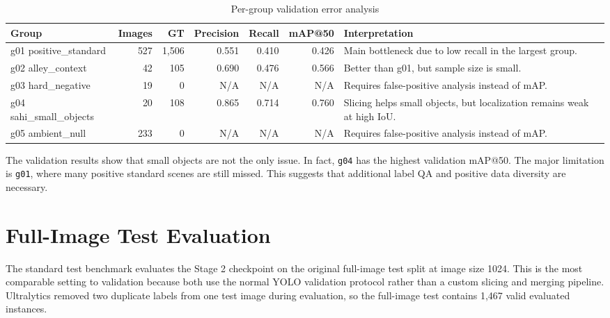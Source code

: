 \documentclass[12pt,a4paper]{report}
\newcommand{\code}[1]{\texttt{#1}}
\begin{document}
\begin{table}[H]
\centering
\small
\caption{Per-group validation error analysis}
\label{tab:group-valid}
\begin{tabularx}{\textwidth}{p{}rrrrrY}
\toprule
\textbf{Group} & \textbf{Images} & \textbf{GT} & \textbf{Precision} & \textbf{Recall} & \textbf{mAP@50} & \textbf{Interpretation} \\
\midrule
g01 positive\_standard & 527 & 1,506 & 0.551 & 0.410 & 0.426 & Main bottleneck due to low recall in the largest group. \\
g02 alley\_context & 42 & 105 & 0.690 & 0.476 & 0.566 & Better than g01, but sample size is small. \\
g03 hard\_negative & 19 & 0 & N/A & N/A & N/A & Requires false-positive analysis instead of mAP. \\
g04 sahi\_small\_objects & 20 & 108 & 0.865 & 0.714 & 0.760 & Slicing helps small objects, but localization remains weak at high IoU. \\
g05 ambient\_null & 233 & 0 & N/A & N/A & N/A & Requires false-positive analysis instead of mAP. \\
\bottomrule
\end{tabularx}
\end{table}

The validation results show that small objects are not the only issue. In fact, \code{g04} has the highest validation mAP@50. The major limitation is \code{g01}, where many positive standard scenes are still missed. This suggests that additional label QA and positive data diversity are necessary.

\section{Full-Image Test Evaluation}
The standard test benchmark evaluates the Stage 2 checkpoint on the original full-image test split at image size 1024. This is the most comparable setting to validation because both use the normal YOLO validation protocol rather than a custom slicing and merging pipeline. Ultralytics removed two duplicate labels from one test image during evaluation, so the full-image test contains 1,467 valid evaluated instances.
\end{document}
